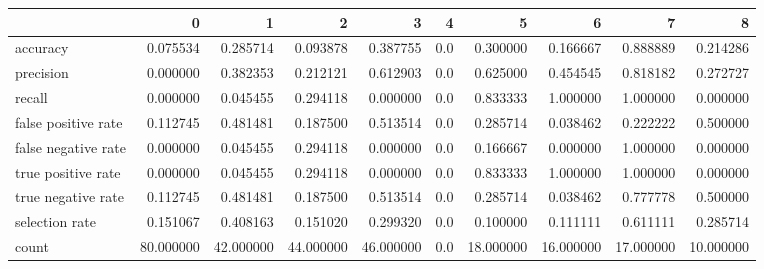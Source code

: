 \begin{tabular}{lrrrrrrrrr}
\toprule
{} &          0 &          1 &          2 &          3 &    4 &          5 &          6 &          7 &          8 \\
\midrule
accuracy            &   0.075534 &   0.285714 &   0.093878 &   0.387755 &  0.0 &   0.300000 &   0.166667 &   0.888889 &   0.214286 \\
precision           &   0.000000 &   0.382353 &   0.212121 &   0.612903 &  0.0 &   0.625000 &   0.454545 &   0.818182 &   0.272727 \\
recall              &   0.000000 &   0.045455 &   0.294118 &   0.000000 &  0.0 &   0.833333 &   1.000000 &   1.000000 &   0.000000 \\
false positive rate &   0.112745 &   0.481481 &   0.187500 &   0.513514 &  0.0 &   0.285714 &   0.038462 &   0.222222 &   0.500000 \\
false negative rate &   0.000000 &   0.045455 &   0.294118 &   0.000000 &  0.0 &   0.166667 &   0.000000 &   1.000000 &   0.000000 \\
true positive rate  &   0.000000 &   0.045455 &   0.294118 &   0.000000 &  0.0 &   0.833333 &   1.000000 &   1.000000 &   0.000000 \\
true negative rate  &   0.112745 &   0.481481 &   0.187500 &   0.513514 &  0.0 &   0.285714 &   0.038462 &   0.777778 &   0.500000 \\
selection rate      &   0.151067 &   0.408163 &   0.151020 &   0.299320 &  0.0 &   0.100000 &   0.111111 &   0.611111 &   0.285714 \\
count               &  80.000000 &  42.000000 &  44.000000 &  46.000000 &  0.0 &  18.000000 &  16.000000 &  17.000000 &  10.000000 \\
\bottomrule
\end{tabular}
